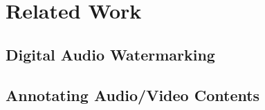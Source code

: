 
\chapter{Related Work}

\section{Digital Audio Watermarking}


\section{Annotating Audio/Video Contents}
